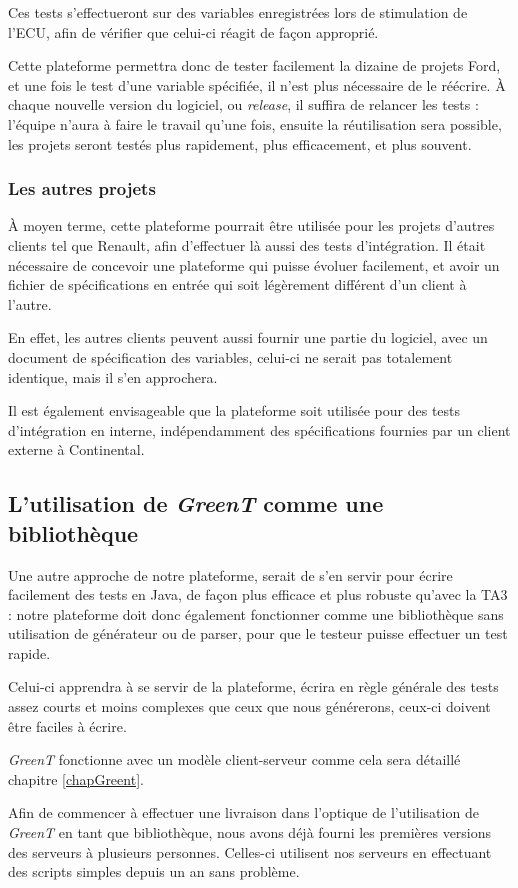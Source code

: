	Ces tests s'effectueront sur des variables enregistrées lors de stimulation de l'ECU, afin de vérifier que celui-ci réagit de façon approprié.

	Cette plateforme permettra donc de tester facilement la dizaine de projets Ford, et une fois le test d'une variable spécifiée, il n'est plus nécessaire de le réécrire. À chaque nouvelle version du logiciel, ou \textit{release}, il suffira de relancer les tests : l'équipe n'aura à faire le travail qu'une fois, ensuite la réutilisation sera possible, les projets seront testés plus rapidement, plus efficacement, et plus souvent.

	\subsubsection{Les autres projets}
	À moyen terme, cette plateforme pourrait être utilisée pour les projets d'autres clients tel que Renault, afin d'effectuer là aussi des tests d'intégration. Il était nécessaire de concevoir une plateforme qui puisse évoluer facilement, et avoir un fichier de spécifications en entrée qui soit légèrement différent d'un client à l'autre.

	En effet, les autres clients peuvent aussi fournir une partie du logiciel, avec un document de spécification des variables, celui-ci ne serait pas totalement identique, mais il s'en approchera.

	Il est également envisageable que la plateforme soit utilisée pour des tests d'intégration en interne, indépendamment des spécifications fournies par un client externe à Continental.
	\newpage
	\subsection{L'utilisation de \textit{GreenT} comme une bibliothèque}
	Une autre approche de notre plateforme, serait de s'en servir pour écrire facilement des tests en Java, de façon plus efficace et plus robuste qu'avec la TA3 : notre plateforme doit donc également fonctionner comme une bibliothèque sans utilisation de générateur ou de parser, pour que le testeur puisse effectuer un test rapide. 

	Celui-ci apprendra à se servir de la plateforme, écrira en règle générale des tests assez courts et moins complexes que ceux que nous générerons, ceux-ci doivent être faciles à écrire.

\begin{remarque}
	\textit{GreenT} fonctionne avec un modèle client-serveur comme cela sera détaillé chapitre \ref{chapGreent}.
	
	 Afin de commencer à effectuer une livraison dans l'optique de l'utilisation de \textit{GreenT} en tant que bibliothèque, nous avons déjà fourni les premières versions des serveurs à plusieurs personnes. Celles-ci utilisent nos serveurs en effectuant des scripts simples depuis un an sans problème.
\end{remarque}